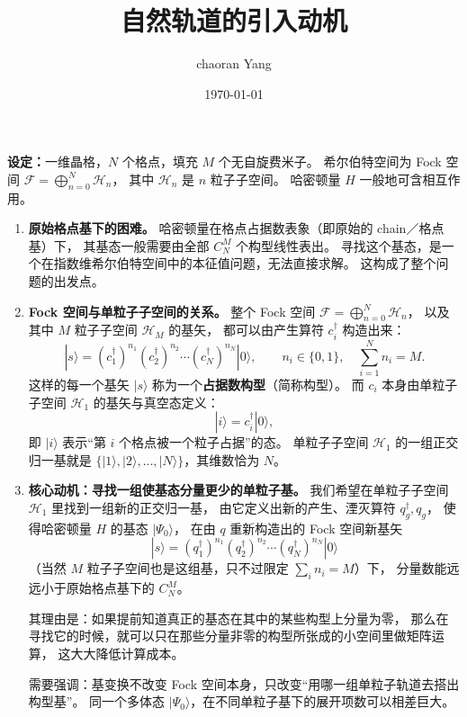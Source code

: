 \documentclass[11pt]{ctexart}
\title{自然轨道的引入动机}
\author{chaoran Yang}
\date{\today}
\begin{document}
\maketitle

\begin{center}
\textbf{设定：}一维晶格，$N$ 个格点，填充 $M$ 个无自旋费米子。
希尔伯特空间为 Fock 空间
$\mathcal{F}=\bigoplus_{n=0}^{N}\mathcal{H}_n$，
其中 $\mathcal{H}_n$ 是 $n$ 粒子子空间。
哈密顿量 $H$ 一般地可含相互作用。
\end{center}

\begin{enumerate}[leftmargin=2em, itemsep=0.8em]

\item \textbf{原始格点基下的困难。}
哈密顿量在格点占据数表象（即原始的 chain／格点基）下，
其基态一般需要由全部 $C_N^M$ 个构型线性表出。
寻找这个基态，是一个在指数维希尔伯特空间中的本征值问题，无法直接求解。
这构成了整个问题的出发点。

\item \textbf{Fock 空间与单粒子子空间的关系。}
整个 Fock 空间 $\mathcal{F}=\bigoplus_{n=0}^{N}\mathcal{H}_n$，
以及其中 $M$ 粒子子空间 $\mathcal{H}_M$ 的基矢，
都可以由产生算符 $c_i^{\dagger}$ 构造出来：
\[
|s\rangle=(c_1^{\dagger})^{n_1}(c_2^{\dagger})^{n_2}\cdots(c_N^{\dagger})^{n_N}|0\rangle,
\qquad n_i\in\{0,1\},\quad \sum_{i=1}^{N}n_i=M .
\]
这样的每一个基矢 $|s\rangle$ 称为一个\textbf{占据数构型}（简称构型）。
而 $c_i$ 本身由单粒子子空间 $\mathcal{H}_1$ 的基矢与真空态定义：
\[
|i\rangle=c_i^{\dagger}|0\rangle ,
\]
即 $|i\rangle$ 表示“第 $i$ 个格点被一个粒子占据”的态。
单粒子子空间 $\mathcal{H}_1$ 的一组正交归一基就是
$\{|1\rangle,|2\rangle,\dots,|N\rangle\}$，其维数恰为 $N$。

\item \textbf{核心动机：寻找一组使基态分量更少的单粒子基。}
我们希望在单粒子子空间 $\mathcal{H}_1$ 里找到一组新的正交归一基，
由它定义出新的产生、湮灭算符 $q_g^{\dagger},q_g$，
使得哈密顿量 $H$ 的基态 $|\Psi_0\rangle$，
在由 $q$ 重新构造出的 Fock 空间新基矢
\[
|s\rangle=(q_1^{\dagger})^{n_1}(q_2^{\dagger})^{n_2}\cdots(q_N^{\dagger})^{n_N}|0\rangle
\]
（当然 $M$ 粒子子空间也是这组基，只不过限定 $\sum_i n_i=M$）下，
分量数能远远小于原始格点基下的 $C_N^M$。

其理由是：如果提前知道真正的基态在其中的某些构型上分量为零，
那么在寻找它的时候，就可以只在那些分量非零的构型所张成的小空间里做矩阵运算，
这大大降低计算成本。

需要强调：基变换不改变 Fock 空间本身，只改变“用哪一组单粒子轨道去搭出构型基”。
同一个多体态 $|\Psi_0\rangle$，在不同单粒子基下的展开项数可以相差巨大。


\end{enumerate}
\end{document}
